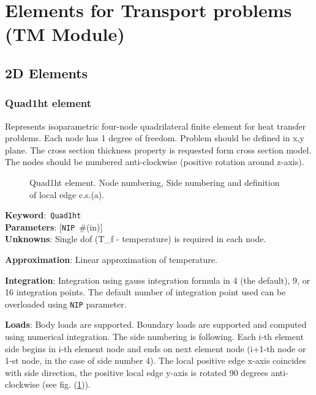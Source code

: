 \documentclass[a4paper]{article}
\newcommand{\descitem}[1]{{\noindent \textbf{#1}}:}
\newcommand{\elemkeyword}[1]{\descitem{Keyword}~\param{#1}} %
\newcommand{\param}[1]{\texttt{#1}} %
\newcommand{\optional}[1]{[#1]} %
\newcommand{\field}[2]{\param{#1}~\#{\tiny(#2)}} %
\newcommand{\optField}[2]{\optional{\field{#1}{#2}}}
\begin{document}
\clearpage
\section{Elements for Transport problems (TM Module)}
\subsection{2D Elements}
\subsubsection{Quad1ht element}
\label{Quad1ht}
Represents isoparametric four-node quadrilateral finite element for
heat transfer problems. Each node has 1 degree of freedom.
Problem should be defined in x,y plane. The cross section thickness
property is requested form cross section model.
The nodes should be numbered anti-clockwise (positive rotation around
z-axis). 

\begin{figure}[htb]
 \centering
 \begin{makeimage}
  
 \end{makeimage}

 \caption{Quad1ht element. Node numbering, Side numbering and
 definition of local edge c.s.(a).}
 \label{Quad1htfig}
\end{figure}

\elemkeyword{Quad1ht}\\
\descitem{Parameters} \optField{NIP}{in}\\
\descitem{Unknowns}
Single dof (T\_f - temperature) is required in each node.

\descitem{Approximation} Linear approximation of temperature.

\descitem{Integration}
Integration using gauss integration formula
in 4 (the default), 9, or 16 integration points. The default number of
integration point used can be overloaded using \param{NIP} parameter.

\descitem{Loads} Body loads are supported. Boundary loads are
supported and computed using numerical integration. The side numbering is
following. Each i-th element side begins in i-th element node and
ends on next element node (i+1-th node or 1-st node, in the case of 
side number 4). The local positive edge x-axis coincides with side
direction, the positive local edge y-axis is rotated 90 degrees
anti-clockwise (see fig. (\ref{Quad1htfig})).
\end{document}
